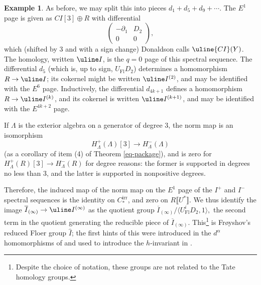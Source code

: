 \documentclass{memo-l}
\theoremstyle{definition}
\newtheorem{example}[theorem]{Example}
\theoremstyle{remark}
\numberwithin{section}{chapter}
\numberwithin{equation}{chapter}
\begin{document}
\begin{example}
As before, we may split this into pieces $d_1 + d_5 + d_9 + \cdots$. The $E^1$ page is given as $CI[3] \oplus R$ with differential $$\begin{pmatrix}-\partial_1 & D_2\\0 & 0\end{pmatrix},$$ which (shifted by 3 and with a sign change) Donaldson calls $\uline{CI}(Y)$. The homology, written $\uline I$, is the $q = 0$ page of this spectral sequence. The differential $d_5$ (which is, up to sign, $U_{\text{Fl}} D_2$) determines a homomorphism $R \to \uline I$; its cokernel might be written $\uline I^{(2)}$, and may be identified with the $E^6$ page. Inductively, the differential $d_{4k+1}$ defines a homomorphism $R \to \uline I^{(k)}$, and its cokernel is written $\uline I^{(k+1)}$, and may be identified with the $E^{4k+2}$ page.

If $\Lambda$ is the exterior algebra on a generator of degree $3$, the norm map is an isomorphism $$H^+_\Lambda(\Lambda)[3] \to H^-_\Lambda(\Lambda)$$ (as a corollary of item (4) of Theorem \ref{eq-package}), and is zero for $H^+_\Lambda(R)[3] \to H^-_\Lambda(R)$ for degree reasons: the former is supported in degrees no less than $3$, and the latter is supported in nonpositive degrees.

Therefore, the induced map of the norm map on the $E^1$ page of the $I^+$ and $I^-$ spectral sequences is the identity on $C_*^{\text{irr}}$, and zero on $R\llbracket U^*\rrbracket$. We thus identify the image $\overline I_{(\infty)} \to \uline I^{(\infty)}$ as the quotient group $\overline I_{(\infty)} / \langle U_{\text{Fl}}^i D_2, 1\rangle,$ the second term in the quotient generating the reducible piece of $\overline I_{(\infty)}$. This\footnote{Despite the choice of notation, these groups are not related to the Tate homology groups.} is Fr\o yshov's reduced Floer group $\widehat I$; the first hints of this were introduced in the $d^\alpha$ homomorphisms of \cite{Fr2} and used to introduce the $h$-invariant in \cite{Fr1}.
\end{example}
\end{document}
